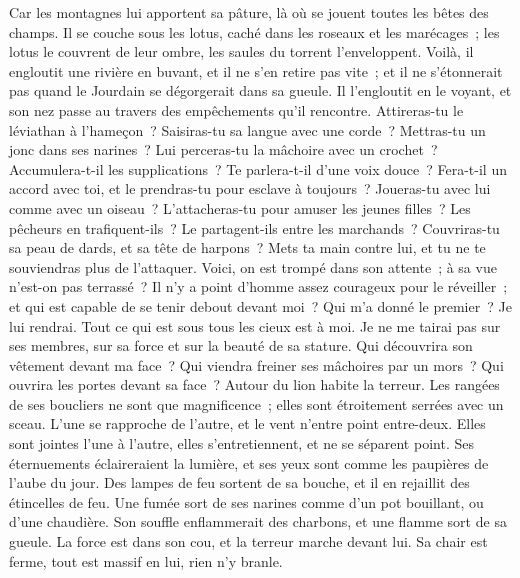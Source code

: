 \begin{multicols}{2}
Car les montagnes lui apportent sa pâture, là où se jouent toutes les bêtes des champs.
Il se couche sous les lotus, caché dans les roseaux et les marécages~;
les lotus le couvrent de leur ombre, les saules du torrent l'enveloppent.
Voilà, il engloutit une rivière en buvant, et il ne s'en retire pas vite~; et il ne s'étonnerait pas quand le Jourdain se dégorgerait dans sa gueule.
Il l'engloutit en le voyant, et son nez passe au travers des empêchements qu'il rencontre.
Attireras-tu le léviathan à l'hameçon~? Saisiras-tu sa langue avec une corde~?
Mettras-tu un jonc dans ses narines~? Lui perceras-tu la mâchoire avec un crochet~?
Accumulera-t-il les supplications~? Te parlera-t-il d'une voix douce~?
Fera-t-il un accord avec toi, et le prendras-tu pour esclave à toujours~?
Joueras-tu avec lui comme avec un oiseau~? L'attacheras-tu pour amuser les jeunes filles~?
Les pêcheurs en trafiquent-ils~? Le partagent-ils entre les marchands~?
Couvriras-tu sa peau de dards, et sa tête de harpons~?
Mets ta main contre lui, et tu ne te souviendras plus de l'attaquer.
Voici, on est trompé dans son attente~; à sa vue n'est-on pas terrassé~?
\VerseOne{}Il n'y a point d'homme assez courageux pour le réveiller~; et qui est capable de se tenir debout devant moi~?
Qui m'a donné le premier~? Je lui rendrai. Tout ce qui est sous tous les cieux est à moi.
Je ne me tairai pas sur ses membres, sur sa force et sur la beauté de sa stature.
Qui découvrira son vêtement devant ma face~? Qui viendra freiner ses mâchoires par un mors~?
Qui ouvrira les portes devant sa face~? Autour du lion habite la terreur.
Les rangées de ses boucliers ne sont que magnificence~; elles sont étroitement serrées avec un sceau.
L'une se rapproche de l'autre, et le vent n'entre point entre-deux.
Elles sont jointes l'une à l'autre, elles s'entretiennent, et ne se séparent point.
Ses éternuements éclaireraient la lumière, et ses yeux sont comme les paupières de l'aube du jour.
Des lampes de feu sortent de sa bouche, et il en rejaillit des étincelles de feu.
Une fumée sort de ses narines comme d'un pot bouillant, ou d'une chaudière.
Son souffle enflammerait des charbons, et une flamme sort de sa gueule.
La force est dans son cou, et la terreur marche devant lui.
Sa chair est ferme, tout est massif en lui, rien n'y branle.

\end{multicols}
